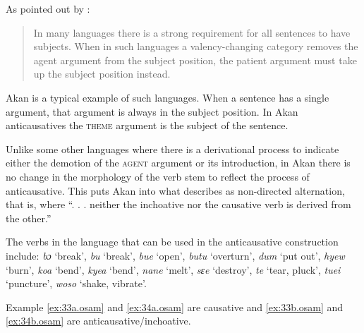 \documentclass[output=paper]{langsci/langscibook}
\begin{document}
As pointed out by \citet[1132]{haspelmathmuellerbardey2004}: 

\begin{quote}
In many languages there is a strong requirement for all sentences to have subjects. When in such languages a valency-changing category removes the agent argument from the subject position, the patient argument must take up the subject position instead.
\end{quote}

Akan is a typical example of such languages. When a sentence has a single argument, that argument is always in the subject position. In Akan anticausatives the \textsc{theme} argument is the subject of the sentence. 

Unlike some other languages where there is a derivational process to indicate either the demotion of the \textsc{agent} argument or its introduction, in Akan there is no change in the morphology of the verb stem to reflect the process of anticausative. This puts Akan into what \citet[91]{haspelmath1993} describes as non-directed alternation, that is, where ``. . . neither the inchoative nor the causative verb is derived from the other.''

The verbs in the language that can be used in the anticausative construction include: \textit{bɔ} `break', \textit{bu} `break', \textit{bue} `open', \textit{butu} `overturn', \textit{dum} `put out', \textit{hyew} `burn', \textit{koa} `bend', \textit{kyea} `bend', \textit{nane} `melt', \textit{sɛe} `destroy', \textit{te} `tear, pluck', \textit{tuei} `puncture', \textit{woso} `shake, vibrate'. 

Example \ref{ex:33a.osam} and \ref{ex:34a.osam} are causative and \ref{ex:33b.osam} and \ref{ex:34b.osam} are anticausative/inchoative.

\ea
\label{ex:33.osam}
	\z

	\z
\z
\end{document}
